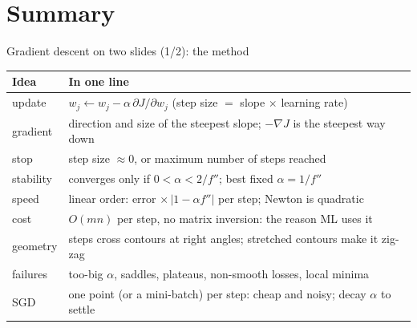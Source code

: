 \section{Summary}

\begin{frame}{Gradient descent on two slides (1/2): the method}
  \centering\footnotesize
  \renewcommand{\arraystretch}{1.35}
  \begin{tabular}{@{}l l@{}}
    \toprule
    Idea & In one line \\
    \midrule
    update & $w_j \leftarrow w_j - \alpha\,\partial J/\partial w_j$ \quad (step size $=$ slope $\times$ learning rate) \\
    gradient & direction and size of the steepest slope; $-\nabla J$ is the steepest way down \\
    stop & step size $\approx0$, or maximum number of steps reached \\
    stability & converges only if $0 < \alpha < 2/f''$; best fixed $\alpha = 1/f''$ \\
    speed & linear order: error $\times\,|1-\alpha f''|$ per step; Newton is quadratic \\
    cost & $O(mn)$ per step, no matrix inversion: the reason ML uses it \\
    geometry & steps cross contours at right angles; stretched contours make it zig-zag \\
    failures & too-big $\alpha$, saddles, plateaus, non-smooth losses, local minima \\
    SGD & one point (or a mini-batch) per step: cheap and noisy; decay $\alpha$ to settle \\
    \bottomrule
  \end{tabular}
\end{frame}

